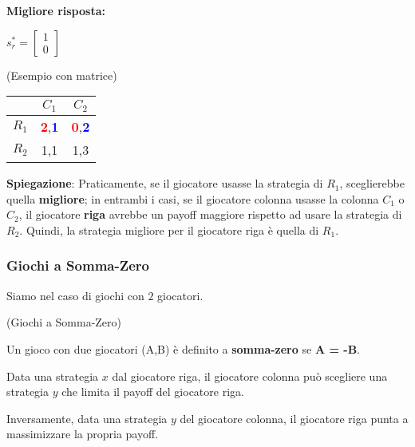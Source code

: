 \textbf{Migliore risposta:}

$s_r^* = \begin{bmatrix}
    1 \\
    0
\end{bmatrix}$





\begin{esempio}(Esempio con matrice)
\end{esempio}

\renewcommand{\arraystretch}{2}

\begin{table}[H]
    \begin{center}
        \begin{tabular}{|c|c|c|}
            \hline
                  & $C_1$                                                    & $C_2$                                                    \\
            \hline
            $R_1$ & \textcolor{red}{\textbf{2}},\textcolor{blue}{\textbf{1}} & \textcolor{red}{\textbf{0}},\textcolor{blue}{\textbf{2}} \\
            \hline
            $R_2$ & 1,1                                                      & 1,3                                                      \\
            \hline
        \end{tabular}
    \end{center}
\end{table}

\textbf{Spiegazione}: Praticamente, se il giocatore usasse la strategia di $R_1$,
sceglierebbe quella \textbf{migliore}; in entrambi i casi, se il giocatore colonna usasse la colonna $C_1$ o $C_2$, il giocatore \textbf{riga} avrebbe un payoff maggiore rispetto ad usare la strategia di $R_2$. Quindi, la strategia migliore per il giocatore riga è quella di $R_1$.

\subsubsection{Giochi a Somma-Zero}

Siamo nel caso di giochi con $2$ giocatori.
\begin{definition}(Giochi a Somma-Zero)

    Un gioco con due giocatori (A,B) è definito a \textbf{somma-zero} se \textbf{A
        = -B}.

    Data una strategia $x$ dal giocatore riga, il giocatore colonna può scegliere
    una strategia $y$ che limita il payoff del giocatore riga.

    Inversamente, data una strategia $y$ del giocatore colonna, il giocatore riga
    punta a massimizzare la propria payoff.
\end{definition}

